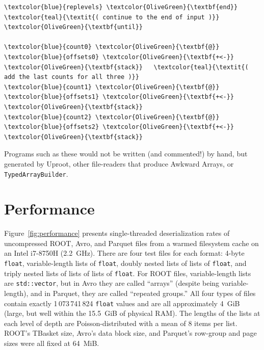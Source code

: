\documentclass{webofc}
\begin{document}
\begin{Verbatim}[commandchars=\\\{\}]
  \textcolor{blue}{replevels} \textcolor{OliveGreen}{\textbf{end}}               \textcolor{teal}{\textit{( continue to the end of input )}}
\textcolor{OliveGreen}{\textbf{until}}

\textcolor{blue}{count0} \textcolor{OliveGreen}{\textbf{@}} \textcolor{blue}{offsets0} \textcolor{OliveGreen}{\textbf{+<-}} \textcolor{OliveGreen}{\textbf{stack}}   \textcolor{teal}{\textit{( add the last counts for all three )}}
\textcolor{blue}{count1} \textcolor{OliveGreen}{\textbf{@}} \textcolor{blue}{offsets1} \textcolor{OliveGreen}{\textbf{+<-}} \textcolor{OliveGreen}{\textbf{stack}}
\textcolor{blue}{count2} \textcolor{OliveGreen}{\textbf{@}} \textcolor{blue}{offsets2} \textcolor{OliveGreen}{\textbf{+<-}} \textcolor{OliveGreen}{\textbf{stack}}
\end{Verbatim}

Programs such as these would not be written (and commented!) by hand, but generated by Uproot, other file-readers that produce Awkward Arrays, or \texttt{TypedArrayBuilder}.

\section{Performance}
\label{sec:performance}

Figure~\ref{fig:performance} presents single-threaded deserialization rates of uncompressed ROOT, Avro, and Parquet files from a warmed filesystem cache on an Intel i7-8750H (2.2~GHz). There are four test files for each format: 4-byte \texttt{float}, variable-length lists of \texttt{float}, doubly nested lists of lists of \texttt{float}, and triply nested lists of lists of lists of \texttt{float}. For ROOT files, variable-length lists are \texttt{std::vector}, but in Avro they are called ``arrays'' (despite being variable-length), and in Parquet, they are called ``repeated groups.'' All four types of files contain exactly 1\,073\,741\,824 \texttt{float} values and are all approximately 4~GiB (large, but well within the 15.5~GiB of physical RAM). The lengths of the lists at each level of depth are Poisson-distributed with a mean of 8 items per list. ROOT's TBasket size, Avro's data block size, and Parquet's row-group and page sizes were all fixed at 64~MiB.
\end{document}
